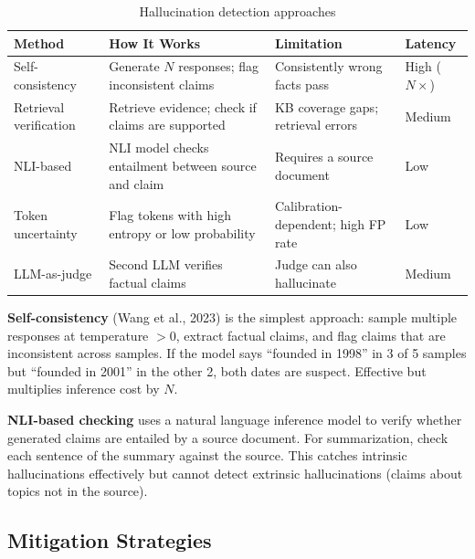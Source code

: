 \begin{table}[H]
\centering
\caption{Hallucination detection approaches}
\begin{tabularx}{\textwidth}{lXXl}
\toprule
\textbf{Method} & \textbf{How It Works} & \textbf{Limitation} & \textbf{Latency} \\
\midrule
Self-consistency & Generate $N$ responses; flag inconsistent claims & Consistently wrong facts pass & High ($N\times$) \\
Retrieval verification & Retrieve evidence; check if claims are supported & KB coverage gaps; retrieval errors & Medium \\
NLI-based & NLI model checks entailment between source and claim & Requires a source document & Low \\
Token uncertainty & Flag tokens with high entropy or low probability & Calibration-dependent; high FP rate & Low \\
LLM-as-judge & Second LLM verifies factual claims & Judge can also hallucinate & Medium \\
\bottomrule
\end{tabularx}
\end{table}

\textbf{Self-consistency} (Wang et al., 2023) is the simplest approach: sample multiple responses at temperature $>0$, extract factual claims, and flag claims that are inconsistent across samples. If the model says ``founded in 1998'' in 3 of 5 samples but ``founded in 2001'' in the other 2, both dates are suspect. Effective but multiplies inference cost by $N$.

\textbf{NLI-based checking} uses a natural language inference model to verify whether generated claims are entailed by a source document. For summarization, check each sentence of the summary against the source. This catches intrinsic hallucinations effectively but cannot detect extrinsic hallucinations (claims about topics not in the source).

\subsection{Mitigation Strategies}

